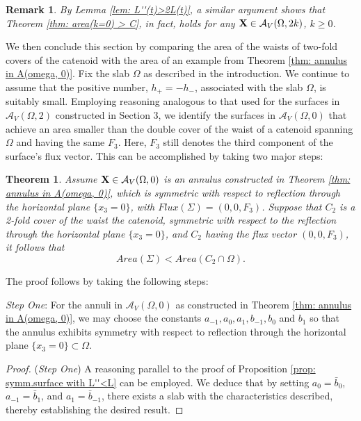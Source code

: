 \documentclass[11pt]{amsart}
\newtheorem{rem}[thm]{\bf{Remark}}
\numberwithin{equation}{section}
\theoremstyle{theorem}
\newtheorem{theorem}{Theorem}[section]
\theoremstyle{definition}
\numberwithin{equation}{section}
\begin{document}
\begin{rem}
    \rm  By Lemma \ref{lem: L''(t)>2L(t)}, a similar argument shows that Theorem \ref{thm: area(k=0) > C}, in fact, holds for any $\bold{X} \in \mathcal{A}_V(\Omega ,2k)$, $k\geq 0$.
\end{rem}

We then conclude this section by comparing the area of the waists of two-fold covers of the catenoid with the area of an example from Theorem  \ref{thm: annulus in A(omega, 0)}.
Fix the slab $\Omega$ as described in the introduction. We continue to assume that the positive number, $h_+=-h_-$, associated with the slab $\Omega$, is suitably small. Employing reasoning analogous to that used for the surfaces in $\mathcal{A}_V(\Omega ,2)$ constructed in Section 3, we identify the surfaces in $\mathcal{A}_V(\Omega ,0)$ that achieve an area smaller than the double cover of the waist of a catenoid spanning $\Omega$ and having the same $F_3$. Here, $F_3$ still denotes the third component of the surface's flux vector. This can be accomplished by taking two major steps: 

\begin{theorem}
    Assume $\bold{X} \in \mathcal{A}_V(\Omega ,0)$ is an annulus constructed in Theorem \ref{thm: annulus in A(omega, 0)}, which is symmetric with respect to reflection through the horizontal plane $\{ x_3=0\}$, with $Flux(\Sigma)=(0,0,F_3)$. Suppose that $C_2$ is a 2-fold cover of the waist the catenoid, symmetric with respect to the reflection through the horizontal plane $\{ x_3=0\}$, and $C_2$ having the flux vector $(0,0,F_3)$, it follows that
    $$
    Area(\Sigma) < Area (C_2 \cap \Omega).
    $$
\end{theorem}

The proof follows by taking the following steps:

\textit{Step One}:
\label{stepone: symmetry in A(omega,0)}
   For the annuli in $\mathcal{A}_V(\Omega ,0)$ as constructed in Theorem \ref{thm: annulus in A(omega, 0)}, we may choose the constants $a_{-1},a_0,a_1,b_{-1},b_0$ and $b_1$ so that the annulus exhibits symmetry with respect to reflection through the horizontal plane $\{ x_3 =0 \} \subset \Omega$. 

\begin{proof} (\textit{Step One})
     A reasoning parallel to the proof of Proposition \ref{prop: symm.surface with L''<L} can be employed. We deduce that by setting $a_0=\bar{b}_0$, $a_{-1} =\bar{b}_1$, and $a_1 = \bar{b}_{-1}$, there exists a slab with the characteristics described, thereby establishing the desired result.
\end{proof}
\end{document}
